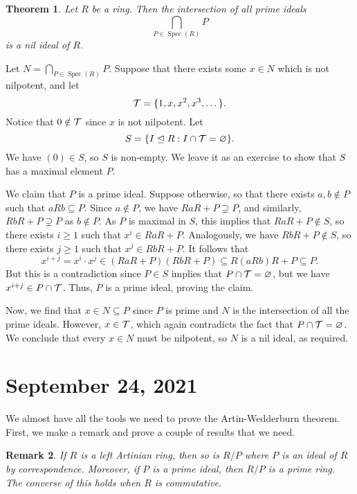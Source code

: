 \documentclass[10pt]{article}
\makeatletter
\numberwithin{equation}{section}
\DeclareMathOperator{\Spec}{Spec}
\theoremstyle{newstyle}
\newtheorem{thm}{Theorem}[section]
\newtheorem{remark}[thm]{Remark}
\newenvironment{pf}[1][\proofname]{\par
  \pushQED{\qed}%
  \normalfont \topsep0\p@\relax
  \trivlist
  \item[\hskip\labelsep\scshape
  #1\@addpunct{.}]\ignorespaces
}{%
  \popQED\endtrivlist\@endpefalse
}
\makeatother
\begin{document}
\begin{thm}
Let $R$ be a ring. Then the intersection of all prime ideals 
\[ \bigcap_{P \in \Spec(R)} P \]
is a nil ideal of $R$. 
\end{thm}
\begin{pf}
Let $N = \bigcap_{P \in \Spec(R)} P$. Suppose that there exists some $x \in N$ which is not nilpotent,
and let 
\[ {\cal T} = \{1, x, x^2, x^3, \dots \}. \]
Notice that $0 \notin {\cal T}$ since $x$ is not nilpotent. Let 
\[ S = \{I \trianglelefteq R : I \cap {\cal T} = \varnothing\}. \]
We have $(0) \in S$, so $S$ is non-empty. We leave it as an exercise to show that $S$ has a maximal 
element $P$. 

We claim that $P$ is a prime ideal. Suppose otherwise, so that there exists $a, b \notin P$ 
such that $aRb \subseteq P$. Since $a \notin P$, we have $RaR + P \supsetneq P$, and similarly, 
$RbR + P \supsetneq P$ as $b \notin P$. As $P$ is maximal in $S$, this implies that 
$RaR + P \notin S$, so there exists $i \geq 1$ such that $x^i \in RaR + P$. 
Analogously, we have $RbR + P \notin S$, so there exists $j \geq 1$ such that $x^j \in RbR + P$. 
It follows that 
\[ x^{i+j} = x^i \cdot x^j \in (RaR + P)(RbR + P) \subseteq R(aRb)R + P \subseteq P. \]
But this is a contradiction since $P \in S$ implies that 
$P \cap {\cal T} = \varnothing$, but we have $x^{i+j} \in P \cap {\cal T}$. 
Thus, $P$ is a prime ideal, proving the claim. 

Now, we find that $x \in N \subseteq P$ since $P$ is prime and $N$ is the intersection of all 
the prime ideals. However, $x \in {\cal T}$, which again contradicts the fact that 
$P \cap {\cal T} = \varnothing$. We conclude that every $x \in N$ must be nilpotent, so 
$N$ is a nil ideal, as required.
\end{pf}

\section{September 24, 2021}
We almost have all the tools we need to prove the Artin-Wedderburn theorem. 
First, we make a remark and prove a couple of results that we need. 

\begin{remark}
If $R$ is a left Artinian ring, then so is $R/P$ where $P$ is an ideal of $R$ by correspondence. 
Moreover, if $P$ is a prime ideal, then $R/P$ is a prime ring. The converse of this holds when 
$R$ is commutative. 
\end{remark}
\end{document}
